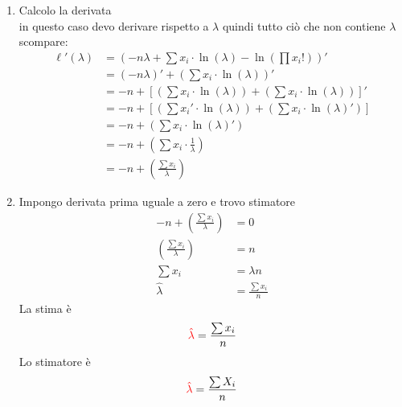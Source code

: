 \documentclass{article}  %
\theoremstyle{definition}
\begin{document}
\begin{esempio}
\begin{enumerate}
\begin{align*}
			                             & = -n \lambda + \sum x_i \cdot \ln(\lambda) - \ln \left(\prod x_i! \right)
		      \end{align*}
		\item Calcolo la derivata \\
		      in questo caso devo derivare rispetto a $\lambda$ quindi tutto ciò che non contiene $\lambda$ scompare:
		      \begin{align*}
			      \ell'(\lambda) & = \left(-n \lambda + \sum x_i \cdot \ln(\lambda) - \ln \left(\prod x_i! \right)\right)'                   \\
			                     & = \left(-n \lambda\right)' + \left(\sum x_i \cdot \ln(\lambda)\right)'                                    \\
			                     & = -n + \left[\left(\sum x_i \cdot \ln(\lambda)\right) + \left(\sum x_i \cdot \ln(\lambda)\right)\right]'  \\
			                     & = -n + \left[\left(\sum x_i' \cdot \ln(\lambda)\right) + \left(\sum x_i \cdot \ln(\lambda)'\right)\right] \\
			                     & = -n + \left(\sum x_i \cdot \ln(\lambda)'\right)                                                          \\
			                     & = -n + \left(\sum x_i \cdot \frac{1}{\lambda}\right)                                                      \\
			                     & = -n + \left(\frac{\sum x_i}{\lambda}\right)
		      \end{align*}
		\item Impongo derivata prima uguale a zero e trovo stimatore
		      \begin{align*}
			      -n + \left(\frac{\sum x_i}{\lambda}\right) & = 0                  \\
			      \left(\frac{\sum x_i}{\lambda}\right)      & = n                  \\
			      \sum x_i                                   & = \lambda n          \\
			      \hat{\lambda}                              & = \frac{\sum x_i}{n}
		      \end{align*}
		      La stima è
		      \begin{align*}
			      \textcolor{red}{\hat{\lambda}} = \frac{\sum x_i}{n}
		      \end{align*}
		      Lo stimatore è
		      \begin{align*}
			      \textcolor{red}{\hat{\lambda}} = \frac{\sum X_i}{n}

\end{align*}
\end{enumerate}
\end{esempio}
\end{document}
